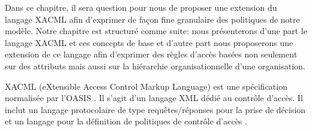 \label{chapLangage}


\label{sectionIntroduction}

Dans ce chapitre, il sera question pour nous de proposer une extension du langage XACML afin d'exprimer de façon fine granulaire des politiques de notre modèle. Notre chapitre est structuré comme suite: nous présenterons d'une part le langage XACML et ces concepts de base et d'autre part nous proposerons une extension de ce langage afin d'exprimer des règles d'accès basées non seulement sur des attributs mais aussi sur la hiérarchie organisationnelle d'une organisation.


\label{sectionXACML}

\label{sectionpresentationXACML}

XACML (eXtensible Access Control Markup Language) est une spécification normalisée par l'OASIS \cite{standard13, anderson03, godik02}. Il s'agit d'un langage XML dédié au contrôle d'accès. Il inclut un langage protocolaire de type requêtes/réponses pour la prise de décision et un langage pour la définition de politiques de contrôle d'accès \cite{abakar12}. \\

